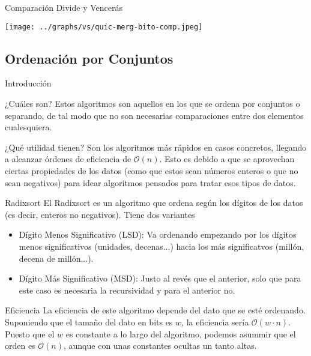 \documentclass[compress]{beamer}
\begin{document}
\begin{frame}{Comparación Divide y Vencerás}
	\begin{alertblock}{}
		\begin{center}
		\texttt{[image: ../graphs/vs/quic-merg-bito-comp.jpeg]}
		\end{center}
	\end{alertblock}
\end{frame}

\subsection{Ordenación por Conjuntos}

\begin{frame}{Introducción}
	\begin{block}{¿Cuáles son?}
	Estos algoritmos son aquellos en los que se ordena por conjuntos o separando, de tal modo que no son necesarias comparaciones entre dos elementos cualesquiera.
	\end{block}
\vspace{0.20in}
	\begin{block}{¿Qué utilidad tienen?}
	Son los algoritmos más rápidos en casos concretos, llegando a alcanzar órdenes de eficiencia de $\mathcal{O}(n)$. Esto es debido a que se aprovechan ciertas propiedades de los datos (como que estos sean números enteros o que no sean negativos) para idear algoritmos pensados para tratar esos tipos de datos.
	\end{block}
\end{frame}

\begin{frame}{Radixsort}
El Radixsort es un algoritmo que ordena según los dígitos de los datos (es decir, enteros no negativos). Tiene dos variantes\\
	\begin{itemize}
	\item Dígito Menos Significativo (LSD): Va ordenando empezando por los dígitos menos significativos (unidades, decenas...) hacia los más significatvos (millón, decena de millón...).
	\item Dígito Más Significativo (MSD): Justo al revés que el anterior, solo que para este caso es necesaria la recursividad y para el anterior no.
	\end{itemize}
	\begin{block}{Eficiencia}
	La eficiencia de este algoritmo depende del dato que se esté ordenando. Suponiendo que el tamaño del dato en bits es $w$, la eficiencia sería $\mathcal{O}(w\cdot n)$. Puesto que el $w$ es constante a lo largo del algoritmo, podemos asummir que el orden es $\mathcal{O}(n)$, aunque con unas constantes ocultas un tanto altas.
	\end{block}
\end{frame}
\end{document}
